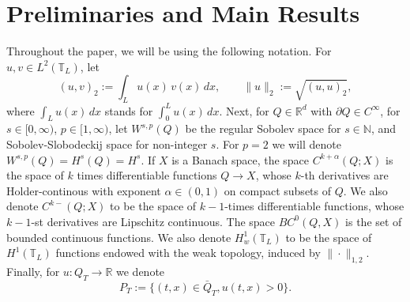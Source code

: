 \documentclass[a4paper,12pt]{article}
\numberwithin{equation}{section}
\newcommand{\N}{{\mathbb N}}
\newcommand{\R}{{\mathbb R}}
\def\N{\mathbb{N}}
\def\R{\mathbb{R}}
\def\N{\mathbb{N}}
\begin{document}
\section{Preliminaries and Main Results} \label{Sec2}

Throughout the paper, we will be using the following notation. For $u,v \in L^2(\mathbb{T}_L)$, let
\[
(u,v)_2 := \int_{L} u(x)\,v(x)\,dx,
\qquad
\|u\|_2 := \sqrt{(u,u)_2},
\]
where $\int_{L} u(x)\,dx$ stands for  $\int_0^{L} u(x)\,dx$.
Next, for $Q \in \R^d$ with $\partial Q \in C^{\infty}$, for $s \in [0, \infty)$, $p \in [1, \infty)$, let $W^{s,p}(Q)$ be the regular Sobolev space for $s \in \N$, and Sobolev-Slobodeckij space for non-integer $s$. For $p=2$ we will denote $W^{s,p}(Q) = H^s(Q) = H^s$. If $X$ is a Banach space, the space $C^{k+\alpha}(Q;X)$ is the space of $k$ times differentiable functions $Q \to X$, whose $k$-th derivatives are Holder-continous with exponent $\alpha \in (0,1)$ on compact subsets of $Q$. We also denote $C^{k-}(Q;X)$ to be the space of $k-1$-times differentiable functions, whose $k-1$-st derivatives are Lipschitz continuous. The space $BC^{0}(Q,X)$ is the set of bounded continuous functions.  We also denote $H^1_w(\mathbb{T}_L)$ to be the space of  $H^1(\mathbb{T}_L)$ functions endowed with the weak topology, induced by $\| \cdot \|_{1,2}$. 
Finally, for  $u: Q_T \to \R$ we denote 
\[
P_T := \{(t,x) \in \bar{Q}_T, u(t,x)>0\}.
\]
\end{document}

